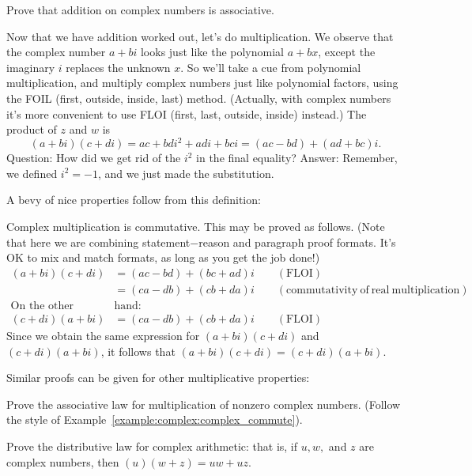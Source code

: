 \begin{exercise}
Prove that addition on complex numbers is associative.
\end{exercise}

Now that we have addition worked out, let's do multiplication. We observe that the complex number $a + bi$ looks just  like the polynomial $a + bx$, except the imaginary $i$ replaces the unknown $x$. So we'll take a cue from polynomial multiplication, and  multiply complex numbers just like
polynomial factors, using the FOIL (first, outside, inside, last) method. (Actually, with complex numbers it's more convenient to use FLOI (first, last, outside, inside) instead.) The product of $z$ and
$w$ is \[
(a+bi)(c+di)=ac+bdi^{2}+adi+bci=(ac-bd)+(ad+bc)i.\]
Question: How did we get rid of the $i^2$ in the final equality?  Answer: Remember, we defined $i^2 = -1$, and we just made the substitution.

A bevy of nice properties follow from this definition:

\begin{example}\label{example:complex:complex_commute}
Complex multiplication is commutative.  This may be proved as follows. (Note that here we are combining statement$-$reason and paragraph proof formats.  It's OK to mix and match formats, as long as you get the job done!) 
\begin{align*}
(a + bi)(c + di) &= (ac - bd) + (bc + ad)i \qquad \mathrm{(FLOI)}\\
& = (ca - db) + (cb + da)i \qquad \mathrm{(commutativity~of~real~multiplication)}\\
\text{On the other }&\text{hand:}\\
(c + di)(a + bi) &= (ca - db) + (cb + da)i \qquad \mathrm{(FLOI)}
\end{align*}
Since we obtain the same expression for $(a + bi)(c + di)$ and $(c + di)(a + bi)$, it follows that 
$(a + bi)(c + di) = (c + di)(a + bi)$.
\end{example}

Similar proofs can be given for other multiplicative properties:

\begin{exercise}\label{exercise:complex:16}
Prove the associative law for multiplication of nonzero complex numbers. (Follow the style of Example~\ref{example:complex:complex_commute}).
\end{exercise}

\begin{exercise}\label{exercise:complex:17}
Prove the distributive law for complex arithmetic: that is, if $u,w,$ and $z$ are complex numbers, then $(u)(w+z) = uw + uz$.
\end{exercise}

